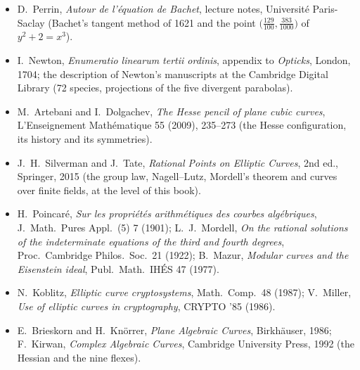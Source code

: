 \begin{itemize}
\item D.~Perrin, \emph{Autour de l'\'equation de Bachet}, lecture notes, Universit\'e Paris-Saclay (Bachet's tangent method of 1621 and the point $\bigl(\frac{129}{100},\frac{383}{1000}\bigr)$
of $y^2+2=x^3$).
\item I.~Newton, \emph{Enumeratio linearum tertii ordinis}, appendix to \emph{Opticks}, London, 1704; the description of Newton's manuscripts at the
Cambridge Digital Library (72 species, projections of the five divergent parabolas).
\item M.~Artebani and I.~Dolgachev, \emph{The Hesse pencil of plane cubic curves}, L'Enseignement Math\'ematique 55 (2009), 235--273 (the Hesse
configuration, its history and its symmetries).
\item J.~H.~Silverman and J.~Tate, \emph{Rational Points on Elliptic Curves}, 2nd ed., Springer, 2015 (the group law, Nagell--Lutz, Mordell's theorem and
curves over finite fields, at the level of this book).
\item H.~Poincar\'e, \emph{Sur les propri\'et\'es arithm\'etiques des courbes alg\'ebriques}, J.\ Math.\ Pures Appl.\ (5) 7 (1901); L.~J.~Mordell, \emph{On the
rational solutions of the indeterminate equations of the third and fourth degrees}, Proc.\ Cambridge Philos.\ Soc.\ 21 (1922); B.~Mazur, \emph{Modular
curves and the Eisenstein ideal}, Publ.\ Math.\ IH\'ES 47 (1977).
\item N.~Koblitz, \emph{Elliptic curve cryptosystems}, Math.\ Comp.\ 48 (1987); V.~Miller, \emph{Use of elliptic curves in cryptography}, CRYPTO '85 (1986).
\item E.~Brieskorn and H.~Kn\"orrer, \emph{Plane Algebraic Curves}, Birkh\"auser, 1986; F.~Kirwan, \emph{Complex Algebraic Curves}, Cambridge University Press,
1992 (the Hessian and the nine flexes).
\end{itemize}
